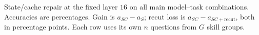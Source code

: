 \begin{table}[t]
\centering
\caption{State/cache repair at the fixed layer $16$ on all main model--task
combinations. Accuracies are percentages. Gain is $a_{SC}-a_S$;
recut loss is $a_{SC}-a_{SC+\mathrm{recut}}$, both in percentage points.
Each row uses its own $n$ questions from $G$ skill groups.}
\label{tab:repair-extension}
\small
\renewcommand{\arraystretch}{1.12}
\setlength{\tabcolsep}{3pt}

\end{table}
